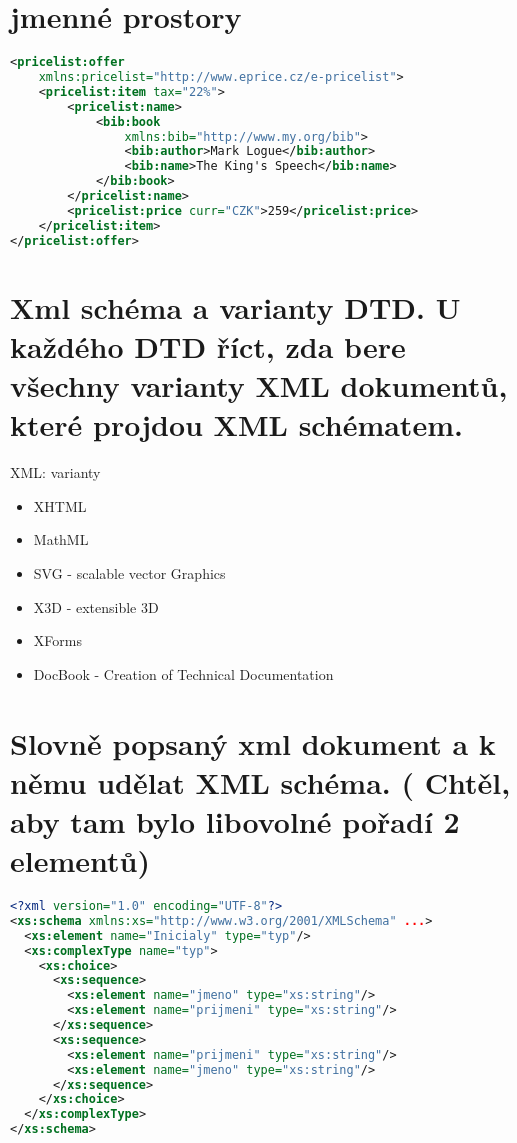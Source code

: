 \documentclass[a4paper,titlepage]{article}
\begin{document}
\section{jmenné prostory}	
	\begin{lstlisting}[language=XML]
<pricelist:offer
	xmlns:pricelist="http://www.eprice.cz/e-pricelist">
	<pricelist:item tax="22%">
		<pricelist:name>
			<bib:book
				xmlns:bib="http://www.my.org/bib">
				<bib:author>Mark Logue</bib:author>
				<bib:name>The King's Speech</bib:name>
			</bib:book>
		</pricelist:name>
		<pricelist:price curr="CZK">259</pricelist:price>
	</pricelist:item>
</pricelist:offer>
	\end{lstlisting}


\section{Xml schéma a varianty DTD. U každého DTD říct, zda bere všechny varianty XML dokumentů, které projdou XML schématem.}
	XML: varianty\\
	\begin{itemize}
		\item XHTML
		\item MathML
		\item SVG - scalable vector Graphics
		\item X3D - extensible 3D
		\item XForms
		
		\item DocBook - Creation of Technical Documentation
	
	\end{itemize}


\section{Slovně popsaný xml dokument a k němu udělat XML schéma. ( Chtěl, aby tam bylo libovolné pořadí 2 elementů) }
		
		\begin{lstlisting}[language=XML]
<?xml version="1.0" encoding="UTF-8"?>
<xs:schema xmlns:xs="http://www.w3.org/2001/XMLSchema" ...>
  <xs:element name="Inicialy" type="typ"/>	
  <xs:complexType name="typ">
    <xs:choice>
      <xs:sequence>
        <xs:element name="jmeno" type="xs:string"/>
        <xs:element name="prijmeni" type="xs:string"/>
      </xs:sequence>
      <xs:sequence>
        <xs:element name="prijmeni" type="xs:string"/>
        <xs:element name="jmeno" type="xs:string"/>
      </xs:sequence>
    </xs:choice>
  </xs:complexType>
</xs:schema>
	\end{lstlisting}
	
\end{document}
